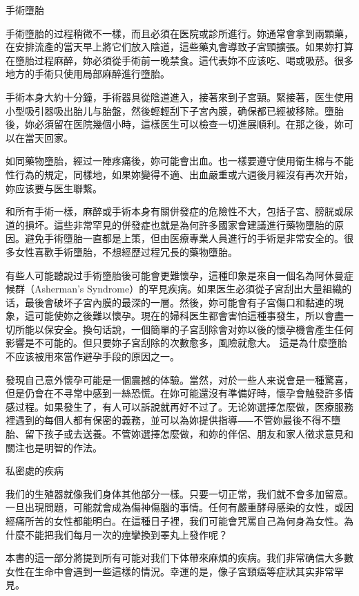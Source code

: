 \documentclass[12pt,UTF8]{ctexbook}
\begin{document}
手術墮胎

手術墮胎的过程稍微不一樣，而且必須在医院或診所進行。妳通常會拿到兩顆藥，在安排流產的當天早上將它们放入陰道，這些藥丸會導致子宮頸擴張。如果妳打算在墮胎过程麻醉，妳必須從手術前一晚禁食。這代表妳不应该吃、喝或吸菸。很多地方的手術只使用局部麻醉進行墮胎。

手術本身大約十分鐘，手術器具從陰道進入，接著來到子宮頸。緊接著，医生使用小型吸引器吸出胎儿与胎盤，然後輕輕刮下子宮內膜，确保都已經被移除。墮胎後，妳必須留在医院幾個小時，這樣医生可以檢查一切進展順利。在那之後，妳可以在當天回家。

如同藥物墮胎，經过一陣疼痛後，妳可能會出血。也一樣要遵守使用衛生棉与不能性行為的規定，同樣地，如果妳變得不適、出血嚴重或六週後月經沒有再次开始，妳应该要与医生聯繫。

和所有手術一樣，麻醉或手術本身有關併發症的危險性不大，包括子宮、膀胱或尿道的損坏。這些非常罕見的併發症也就是為何許多國家會建議進行藥物墮胎的原因。避免手術墮胎一直都是上策，但由医療專業人員進行的手術是非常安全的。很多女性喜歡手術墮胎，不想經歷过程冗長的藥物墮胎。

有些人可能聽說过手術墮胎後可能會更難懷孕，這種印象是來自一個名為阿休曼症候群（Asherman's Syndrome）的罕見疾病。如果医生必須從子宮刮出大量組織的话，最後會破坏子宮內膜的最深的一層。然後，妳可能會有子宮傷口和黏連的現象，這可能使妳之後難以懷孕。現在的婦科医生都會害怕這種事發生，所以會盡一切所能以保安全。換句话說，一個簡單的子宮刮除會对妳以後的懷孕機會產生任何影響是不可能的。但只要妳子宮刮除的次數愈多，風險就愈大。 這是為什麼墮胎不应该被用來當作避孕手段的原因之一。

發現自己意外懷孕可能是一個震撼的体驗。當然，对於一些人来说會是一種驚喜，但是仍會在不寻常中感到一絲恐慌。在妳可能還沒有準備好時，懷孕會触發許多情感过程。如果發生了，有人可以訴說就再好不过了。无论妳選擇怎麼做，医療服務裡遇到的每個人都有保密的義務，並可以為妳提供指導⸺不管妳最後不得不墮胎、留下孩子或去送養。不管妳選擇怎麼做，和妳的伴侶、朋友和家人徵求意見和關注也是明智的作法。





私密處的疾病





我们的生殖器就像我们身体其他部分一樣。只要一切正常，我们就不會多加留意。一旦出現問題，可能就會成為傷神傷腦的事情。任何有嚴重酵母感染的女性，或因經痛所苦的女性都能明白。在這種日子裡，我们可能會咒罵自己為何身為女性。為什麼不能把我们每月一次的痙攣換到睪丸上發作呢？

本書的這一部分將提到所有可能对我们下体帶來麻煩的疾病。我们非常确信大多數女性在生命中會遇到一些這樣的情況。幸運的是，像子宮頸癌等症狀其实非常罕見。
\end{document}
